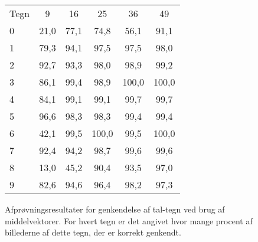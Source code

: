 \begin{figure}[htp]
\centering
\begin{tabular}{|l|c|c|c|c|c|}\hline
\rowcolor[gray]{0.9} \multicolumn{6}{|>{\columncolor[gray]{0.9}}c|}{\textbf{Middelvektor}} \\ \hline
Tegn & 9 & 16 & 25 & 36 & 49\\\hline
0 & 21,0 & 77,1 & 74,8 & 56,1 & 91,1\\\hline
1 & 79,3 & 94,1 & 97,5 & 97,5 & 98,0\\\hline
2 & 92,7 & 93,3 & 98,0 & 98,9 & 99,2\\\hline
3 & 86,1 & 99,4 & 98,9 & 100,0 & 100,0\\\hline
4 & 84,1 & 99,1 & 99,1 & 99,7 & 99,7\\\hline
5 & 96,6 & 98,3 & 98,3 & 99,4 & 99,4\\\hline
6 & 42,1 & 99,5 & 100,0 & 99,5 & 100,0\\\hline
7 & 92,4 & 94,2 & 98,7 & 99,6 & 99,6\\\hline
8 & 13,0 & 45,2 & 90,4 & 93,5 & 97,0\\\hline
9 & 82,6 & 94,6 & 96,4 & 98,2 & 97,3\\\hline
\end{tabular}
\caption{Afprøvningsresultater for genkendelse af tal-tegn ved brug af middelvektorer. For hvert tegn er det angivet hvor mange procent af billederne af dette tegn, der er korrekt genkendt.}
\label{fig:test:middel_tal}
\end{figure}

